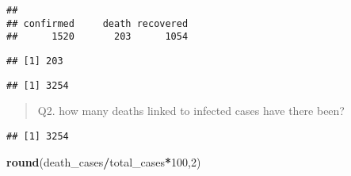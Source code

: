 \documentclass[
]{article}
\newenvironment{Shaded}{\begin{snugshade}}{\end{snugshade}}
\newcommand{\DecValTok}[1]{\textcolor[rgb]{0.00,0.00,0.81}{#1}}
\newcommand{\KeywordTok}[1]{\textcolor[rgb]{0.13,0.29,0.53}{\textbf{#1}}}
\newcommand{\NormalTok}[1]{#1}
\newcommand{\OperatorTok}[1]{\textcolor[rgb]{0.81,0.36,0.00}{\textbf{#1}}}
\newcommand{\StringTok}[1]{\textcolor[rgb]{0.31,0.60,0.02}{#1}}
\begin{document}
\begin{verbatim}
## 
## confirmed     death recovered 
##      1520       203      1054
\end{verbatim}

\begin{Shaded}
\end{Shaded}

\begin{verbatim}
## [1] 203
\end{verbatim}

\begin{Shaded}
\end{Shaded}

\begin{verbatim}
## [1] 3254
\end{verbatim}

\begin{quote}
Q2. how many deaths linked to infected cases have there been?
\end{quote}

\begin{Shaded}
\end{Shaded}

\begin{verbatim}
## [1] 3254
\end{verbatim}

\begin{Shaded}
\begin{Highlighting}[]
\KeywordTok{round}\NormalTok{(death_cases}\OperatorTok{/}\NormalTok{total_cases}\OperatorTok{*}\DecValTok{100}\NormalTok{,}\DecValTok{2}\NormalTok{)}
\end{Highlighting}
\end{Shaded}
\end{document}
